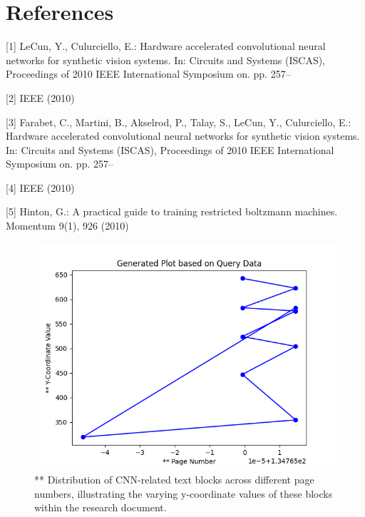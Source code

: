 \documentclass[a4paper,twocolumn]{article}%
\begin{document}
%
\section*{References}%
\label{sec:References}%
[1] LeCun, Y., Culurciello, E.: Hardware accelerated convolutional neural networks for synthetic vision systems. In: Circuits and Systems (ISCAS), Proceedings of 2010 IEEE International Symposium on. pp. 257–

[2] IEEE (2010)

[3] Farabet, C., Martini, B., Akselrod, P., Talay, S., LeCun, Y., Culurciello, E.: Hardware accelerated convolutional neural networks for synthetic vision systems. In: Circuits and Systems (ISCAS), Proceedings of 2010 IEEE International Symposium on. pp. 257–

[4] IEEE (2010)

[5] Hinton, G.: A practical guide to training restricted boltzmann machines. Momentum 9(1), 926 (2010)

%


\begin{figure}[h!]%
\centering%
\includegraphics[width=0.9\linewidth]{plot_image.png}%
\caption{** Distribution of CNN{-}related text blocks across different page numbers, illustrating the varying y{-}coordinate values of these blocks within the research document.}%
\end{figure}

%
\end{document}
